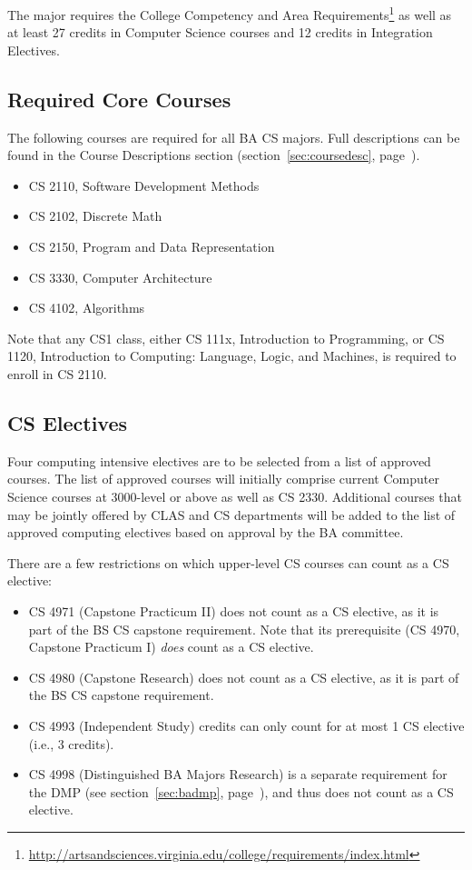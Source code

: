 \documentclass[10pt,letter,twocolumn]{book}
\newenvironment{itemlist}{
\begin{itemize}
\setlength{\itemsep}{0pt}
\setlength{\parskip}{0pt}}
{\end{itemize}}
\newcommand{\myurl}[1]{\footnote{\scriptsize\url{#1}}}
\begin{document}
The major requires the College Competency and Area
Requirements\myurl{http://artsandsciences.virginia.edu/college/requirements/index.html}
as well as at least 27 credits in Computer Science courses and 12
credits in Integration Electives.

\subsection{Required Core Courses}
\label{sec:bacs-corecourses}

The following courses are required for all BA CS majors.  Full
descriptions can be found in the Course Descriptions section
(section~\ref{sec:coursedesc}, page~\pageref{sec:coursedesc}).

\begin{itemlist}
\item CS 2110, Software Development Methods
\item CS 2102, Discrete Math
\item CS 2150, Program and Data Representation
\item CS 3330, Computer Architecture
\item CS 4102, Algorithms
\end{itemlist}

Note that any CS1 class, either CS 111x, Introduction to Programming,
or CS 1120, Introduction to Computing: Language, Logic, and Machines,
is required to enroll in CS 2110.

\subsection{CS Electives}
\label{sec:bacs-cselectives}

Four computing intensive electives are to be selected from a list of
approved courses. The list of approved courses will initially comprise
current Computer Science courses at 3000-level or above as well as CS
2330. Additional courses that may be jointly offered by CLAS and CS
departments will be added to the list of approved computing electives
based on approval by the BA committee.

There are a few restrictions on which upper-level CS courses can count
as a CS elective:

\begin{itemlist}
\item CS 4971 (Capstone Practicum II) does not count as a CS elective,
as it is part of the BS CS capstone requirement.  Note that its
prerequisite (CS 4970, Capstone Practicum I) {\em does} count as a CS
elective.
\item CS 4980 (Capstone Research) does not count as a CS elective, as
it is part of the BS CS capstone requirement.
\item CS 4993 (Independent Study) credits can only count for at most 1
CS elective (i.e., 3 credits).
\item CS 4998 (Distinguished BA Majors Research) is a separate
  requirement for the DMP (see section~\ref{sec:badmp},
  page~\pageref{sec:badmp}), and thus does not count as a CS elective.
\end{itemlist}
\end{document}
